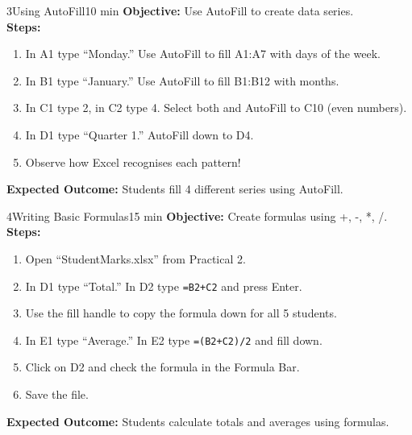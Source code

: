 \begin{labactivity}{3}{Using AutoFill}{10 min}
\textbf{Objective:} Use AutoFill to create data series.\\[4pt]
\textbf{Steps:}
\begin{enumerate}[label=\protect\stepcircle{\arabic*}, leftmargin=2cm, itemsep=4pt]
  \item In A1 type ``Monday.'' Use AutoFill to fill A1:A7 with days of the week.
  \item In B1 type ``January.'' Use AutoFill to fill B1:B12 with months.
  \item In C1 type 2, in C2 type 4. Select both and AutoFill to C10 (even numbers).
  \item In D1 type ``Quarter 1.'' AutoFill down to D4.
  \item Observe how Excel recognises each pattern!
\end{enumerate}
\textbf{Expected Outcome:} Students fill 4 different series using AutoFill.
\welldone
\end{labactivity}

\begin{labactivity}{4}{Writing Basic Formulas}{15 min}
\textbf{Objective:} Create formulas using +, -, *, /.\\[4pt]
\textbf{Steps:}
\begin{enumerate}[label=\protect\stepcircle{\arabic*}, leftmargin=2cm, itemsep=4pt]
  \item Open ``StudentMarks.xlsx'' from Practical 2.
  \item In D1 type ``Total.'' In D2 type \texttt{=B2+C2} and press Enter.
  \item Use the fill handle to copy the formula down for all 5 students.
  \item In E1 type ``Average.'' In E2 type \texttt{=(B2+C2)/2} and fill down.
  \item Click on D2 and check the formula in the Formula Bar.
  \item Save the file.
\end{enumerate}
\textbf{Expected Outcome:} Students calculate totals and averages using formulas.
\welldone
\end{labactivity}

